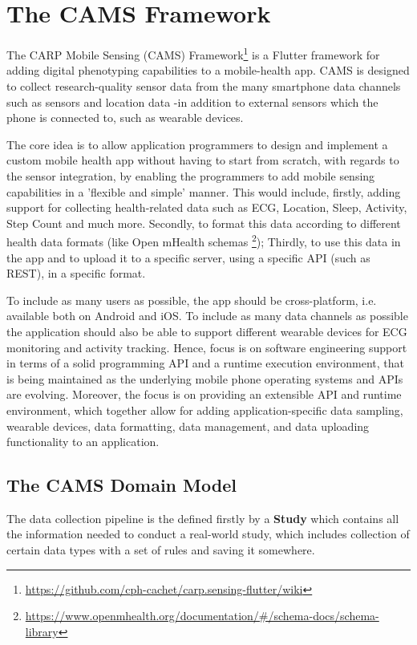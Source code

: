 \section{The CAMS Framework}
The CARP Mobile Sensing (CAMS) Framework\footnote{\url{https://github.com/cph-cachet/carp.sensing-flutter/wiki}} is a Flutter framework for adding digital phenotyping capabilities to a mobile-health app. CAMS is designed to collect research-quality sensor data from the many smartphone data channels such as sensors and location data -in addition to external sensors which the phone is connected to, such as wearable devices.  

The core idea is to allow application programmers to design and implement a custom mobile health app without having to start from scratch, with regards to the sensor integration, by enabling the programmers to add mobile sensing capabilities in a 'flexible and simple' manner. This would include, firstly, adding support for collecting health-related data such as ECG, Location, Sleep, Activity, Step Count and much more. Secondly, to format this data according to different health data formats (like Open mHealth schemas \footnote{\url{https://www.openmhealth.org/documentation/#/schema-docs/schema-library}}); Thirdly, to use this data in the app and to upload it to a specific server, using a specific API (such as REST), in a specific format.

To include as many users as possible, the app should be cross-platform, i.e. available both on Android and iOS. To include as many data channels as possible the application should also be able to support different wearable devices for ECG monitoring and activity tracking. Hence, focus is on software engineering support in terms of a solid programming API and a runtime execution environment, that is being maintained as the underlying mobile phone operating systems and APIs are evolving. Moreover, the focus is on providing an extensible API and runtime environment, which together allow for adding application-specific data sampling, wearable devices, data formatting, data management, and data uploading functionality to an application.

\subsection{The CAMS Domain Model}
The data collection pipeline is the defined firstly by a \textbf{Study} which contains all the information needed to conduct a real-world study, which includes collection of certain data types with a set of rules and saving it somewhere. 

